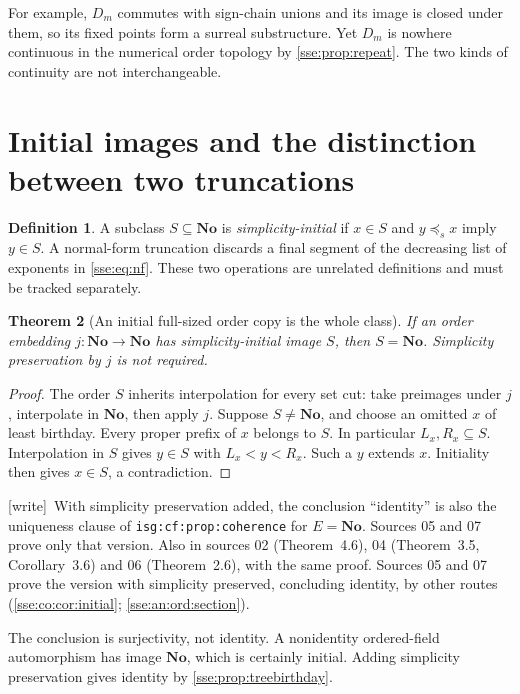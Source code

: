 \documentclass[11pt,a4paper]{article}
\numberwithin{equation}{section}
\theoremstyle{plain}
\newtheorem{theorem}{Theorem}[section]
\theoremstyle{definition}
\newtheorem{definition}[theorem]{Definition}
\theoremstyle{remark}
\newcommand{\No}{\mathbf{No}}
\newcommand{\pref}{\preccurlyeq_s}
\newcommand{\lbl}[1]{\nolinkurl{#1}}%
\newcommand{\wtag}{\textup{\textsf{[write]}}}%
\newenvironment{wnote}{\par\smallskip\noindent\wtag\ }{\par\smallskip}
\begin{document}
For example, $D_m$ commutes with sign-chain unions and its image is closed
under them, so its fixed points form a surreal substructure. Yet $D_m$
is nowhere continuous in the numerical order topology by
\cref{sse:prop:repeat}. The two kinds of continuity are not interchangeable.

\section{Initial images and the distinction between two truncations}\label{sse:sec:initial}

\begin{definition}
A subclass $S\subseteq\No$ is \emph{simplicity-initial} if $x\in S$ and
$y\pref x$ imply $y\in S$. A normal-form truncation discards a final segment
of the decreasing list of exponents in \eqref{sse:eq:nf}. These two operations
are unrelated definitions and must be tracked separately.
\end{definition}

\begin{theorem}[An initial full-sized order copy is the whole class]
\label{sse:thm:initial}
If an order embedding $j:\No\to\No$ has simplicity-initial image $S$, then
$S=\No$. Simplicity preservation by $j$ is not required.
\end{theorem}
\begin{proof}
The order $S$ inherits interpolation for every set cut: take preimages
under $j$, interpolate in $\No$, then apply $j$.
Suppose $S\ne\No$, and choose an omitted $x$ of least birthday. Every
proper prefix of $x$ belongs to $S$. In particular $L_x,R_x\subseteq S$.
Interpolation in $S$ gives $y\in S$ with $L_x<y<R_x$. Such a $y$ extends
$x$. Initiality then gives $x\in S$, a contradiction.
\end{proof}
\begin{wnote}With simplicity preservation added, the conclusion ``identity'' is also the uniqueness clause of \lbl{isg:cf:prop:coherence} for $E=\No$. Sources 05 and 07 prove only that version. Also in sources 02 (Theorem~4.6), 04 (Theorem~3.5, Corollary~3.6) and 06 (Theorem~2.6), with the same proof. Sources 05 and 07 prove the version with simplicity preserved, concluding identity, by other routes (\cref{sse:co:cor:initial}; \cref{sse:an:ord:section}).\end{wnote}
The conclusion is surjectivity, not identity. A nonidentity ordered-field
automorphism has image $\No$, which is certainly initial. Adding simplicity
preservation gives identity by \cref{sse:prop:treebirthday}.
\end{document}
